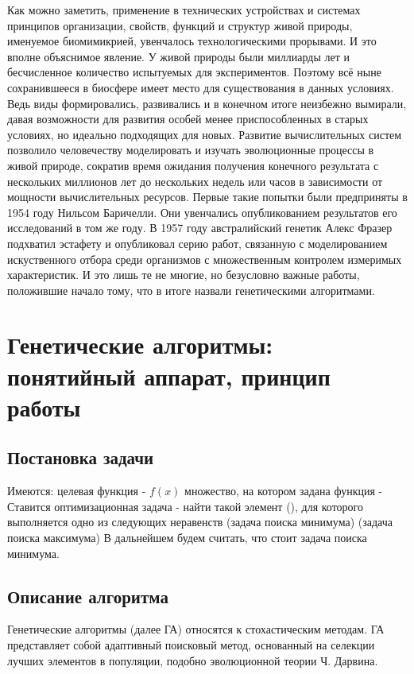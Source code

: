 Как можно заметить, применение в технических устройствах и системах принципов организации, свойств, функций и структур живой природы, именуемое биомимикрией, увенчалось технологическими прорывами. И это вполне объяснимое явление. У живой природы были миллиарды лет и бесчисленное количество испытуемых для экспериментов. Поэтому всё ныне сохранившееся в биосфере имеет место для существования в данных условиях. Ведь виды формировались, развивались и в конечном итоге неизбежно вымирали, давая возможности для развития особей менее приспособленных в старых условиях, но идеально подходящих для новых.
Развитие вычислительных систем позволило человечеству моделировать и изучать эволюционные процессы в живой природе, сократив время ожидания получения конечного результата с нескольких миллионов лет до нескольких недель или часов в зависимости от мощности вычислительных ресурсов. Первые такие попытки были предприняты в 1954 году Нильсом Баричелли. Они увенчались опубликованием результатов его исследований в том же году. В 1957 году австралийский генетик Алекс Фразер подхватил эстафету и опубликовал серию работ, связанную с моделированием искуственного отбора среди организмов с множественным контролем измеримых характеристик. И это лишь те не многие, но безусловно важные работы, положившие начало тому, что в итоге назвали генетическими алгоритмами.
\chapter{Генетические алгоритмы: понятийный аппарат, принцип работы}
\section{Постановка задачи}
Имеются:
целевая функция -  $f(x)$
множество, на котором задана функция - 
Ставится оптимизационная задача - найти такой элемент (), для которого выполняется одно из следующих неравенств
(задача поиска минимума)
(задача поиска максимума)
В дальнейшем будем считать, что стоит задача поиска минимума.

\section{Описание алгоритма}
Генетические алгоритмы (далее ГА) относятся к стохастическим методам. ГА представляет собой адаптивный поисковый метод, основанный на селекции лучших элементов в популяции, подобно эволюционной теории Ч. Дарвина.

